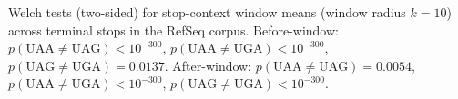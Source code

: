 Welch tests (two-sided) for stop-context window means (window radius $k=10$) across terminal stops in the RefSeq corpus. Before-window: $p(\mathrm{UAA}\!\neq\!\mathrm{UAG})<10^{-300}$, $p(\mathrm{UAA}\!\neq\!\mathrm{UGA})<10^{-300}$, $p(\mathrm{UAG}\!\neq\!\mathrm{UGA})=0.0137$. After-window: $p(\mathrm{UAA}\!\neq\!\mathrm{UAG})=0.0054$, $p(\mathrm{UAA}\!\neq\!\mathrm{UGA})<10^{-300}$, $p(\mathrm{UAG}\!\neq\!\mathrm{UGA})<10^{-300}$.
